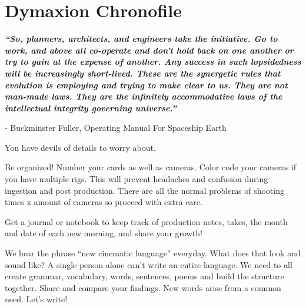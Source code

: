 \chapter{Dymaxion Chronofile}
\pagecolor{white}
\label{chap:27}
\begin{fullwidth}


{\itshape\bfseries “So, planners, architects, and engineers take the initiative. Go to work, and above all co-operate and don't hold back on one another or try to gain at the expense of another. Any success in such lopsidedness will be increasingly short-lived. These are the synergetic rules that evolution is employing and trying to make clear to us. They are not man-made laws. They are the infinitely accommodative laws of the intellectual integrity governing universe.”}

- Buckminster Fuller, Operating Manual For Spaceship Earth
\vspace{\baselineskip}

\problem

{\large You have devils of details to worry about. \par}

Be organized! Number your cards as well as cameras. Color code your cameras if you have multiple rigs. This will prevent headaches and confusion during ingestion and post production. There are all the normal problems of shooting times x amount of cameras so proceed with extra care. 


\solution

{\large Get a journal or notebook to keep track of production notes, takes, the month and date of each new morning, and share your growth! \par}

We hear the phrase “new cinematic language” everyday. What does that look and sound like? A single person alone can’t write an entire language. We need to all create grammar, vocabulary, words, sentences, poems and build the structure together. Share and compare your findings. New words arise from a common need.  Let’s write!




\clearpage
\end{fullwidth}
